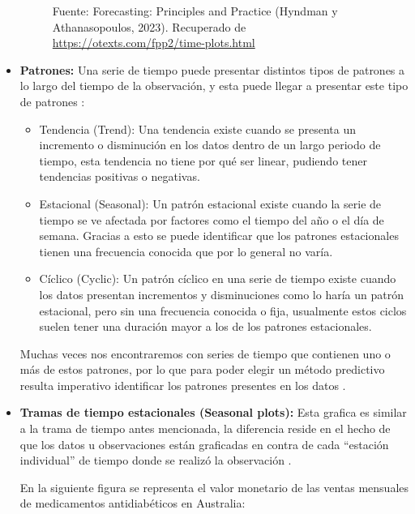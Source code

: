 \begin{itemize}
\begin{figure}[H]
        \begin{minipage}[t]{0.9\textwidth}
            Fuente: Forecasting: Principles and Practice (Hyndman y Athanasopoulos, 2023). Recuperado de \url{https://otexts.com/fpp2/time-plots.html}
        \end{minipage}
    \end{figure}
    
    \item \textbf{Patrones:} Una serie de tiempo puede presentar distintos tipos de patrones a lo largo del tiempo de la observación, y esta puede llegar a presentar este tipo de patrones \cite{forecast-time-series-arima}:
        \begin{itemize}
            \item Tendencia (Trend): Una tendencia existe cuando se presenta un incremento o disminución en los datos dentro de un largo periodo de tiempo, esta tendencia no tiene por qué ser linear, pudiendo tener tendencias positivas o negativas.
            \item Estacional (Seasonal): Un patrón estacional existe cuando la serie de tiempo se ve afectada por factores como el tiempo del año o el día de semana. Gracias a esto se puede identificar que los patrones estacionales tienen una frecuencia conocida que por lo general no varía.
            \item Cíclico (Cyclic): Un patrón cíclico en una serie de tiempo existe cuando los datos presentan incrementos y disminuciones como lo haría un patrón estacional, pero sin una frecuencia conocida o fija, usualmente estos ciclos suelen tener una duración mayor a los de los patrones estacionales. 
        \end{itemize}

        Muchas veces nos encontraremos con series de tiempo que contienen uno o más de estos patrones, por lo que para poder elegir un método predictivo resulta imperativo identificar los patrones presentes en los datos \cite{forecast-time-series-arima}.

    \item \textbf{Tramas de tiempo estacionales (Seasonal plots):} Esta grafica es similar a la trama de tiempo antes mencionada, la diferencia reside en el hecho de que los datos u observaciones están graficadas en contra de cada “estación individual” de tiempo donde se realizó la observación \cite{forecast-time-series-arima}.
    
        En la siguiente figura se representa el valor monetario de las ventas mensuales de medicamentos antidiabéticos en Australia:
        

\end{itemize}
